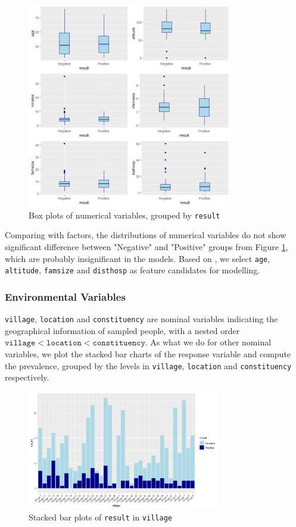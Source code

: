 \documentclass[11pt,twoside]{article}
\numberwithin{Theorem}{section}
\numberwithin{Definition}{section}
\numberwithin{Lemma}{section}
\numberwithin{Algorithm}{section}
\numberwithin{equation}{section}
\begin{document}
\begin{figure}[!h]
	\centering
	\includegraphics[width = 0.8\textwidth]{Images/numerical.png}
	\caption{Box plots of numerical variables, grouped by \texttt{result}}
	\label{fig:numerical}
\end{figure}

Comparing with factors, the distributions of numerical variables do not show significant difference between "Negative" and "Positive" groups from Figure \ref{fig:numerical}, which are probably insignificant in the models. Based on \cite{goarant2016leptospirosis}, we select \texttt{age}, \texttt{altitude}, \texttt{famsize} and \texttt{disthosp} as feature candidates for modelling. 

\subsubsection{Environmental Variables}

\texttt{village}, \texttt{location} and \texttt{constituency} are nominal variables indicating the geographical information of sampled people, with a nested order $\texttt{village} < \texttt{location} < \texttt{constituency}$.  As what we do for other nominal variables, we plot the stacked bar charts of the response variable and compute the prevalence, grouped by the levels in \texttt{village}, \texttt{location} and \texttt{constituency} respectively. 

\begin{figure}[!h]
	\centering
	\includegraphics[width = 0.75\textwidth]{Images/village.png}
	\caption{Stacked bar plots of \texttt{result} in \texttt{village}}
	\label{fig:village} 
\end{figure}
\end{document}
